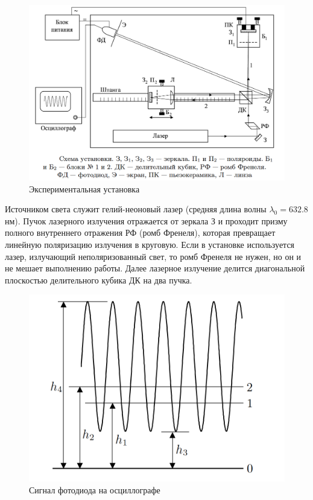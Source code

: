 \documentclass[12pt,a4paper]{article}
\begin{document}
    \begin{figure}[h!]
    	\centering
    	\includegraphics[width=\linewidth]{res/lab.png}
    	\caption{Экспериментальная установка}
    	\label{lab}
    \end{figure}

    Источником света служит гелий-неоновый лазер (средняя длина
    волны $ \lambda_0 = 632.8 $ нм). Пучок лазерного излучения отражается от зеркала З и проходит призму полного внутреннего отражения РФ (ромб Френеля), которая превращает линейную поляризацию излучения в круговую. Если в установке используется лазер, излучающий неполяризованный свет, то ромб Френеля не нужен, но он и не мешает выполнению
    работы. Далее лазерное излучение делится диагональной плоскостью
    делительного кубика ДК на два пучка.
    
    \begin{figure} 
    	\includegraphics[width=\linewidth]{res/os}
    	\caption{Сигнал фотодиода на осциллографе}
    	\label{}
    \end{figure}
    
\end{document}
